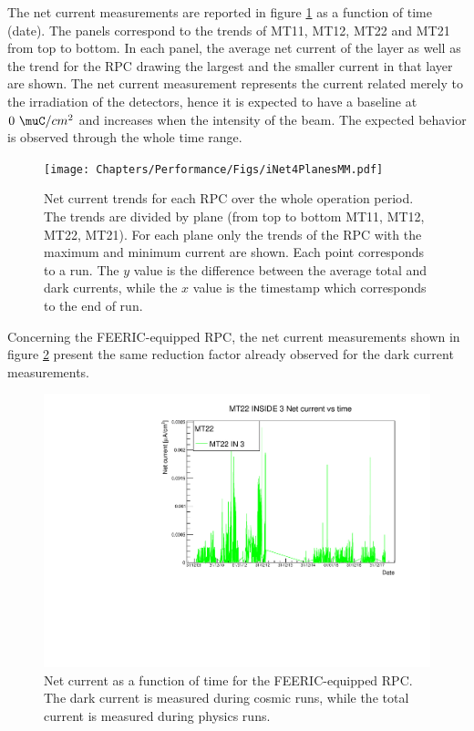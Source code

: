 The net current measurements are reported in figure \ref{fig:iNet4Planes} as a function of time (date).
The panels correspond to the trends of MT11, MT12, MT22 and MT21 from top to bottom.
In each panel, the average net current of the layer as well as the trend for the RPC drawing the largest and the smaller current in that layer are shown.
The net current measurement represents the current related merely to the irradiation of the detectors, hence it is expected to have a baseline at $0\ \muC/cm^2$ and increases when the intensity of the beam.
The expected behavior is observed through the whole time range.

\begin{figure}[!t]
\begin{center}
\texttt{[image: Chapters/Performance/Figs/iNet4PlanesMM.pdf]}
\caption{Net current trends for each RPC over the whole operation period. The trends are divided by plane (from top to bottom MT11, MT12, MT22, MT21). For each plane only the trends of the RPC with the maximum and minimum current are shown. Each point corresponds to a run. The $y$ value is the difference between the average total and dark currents, while the $x$ value is the timestamp which corresponds to the end of run.}
\label{fig:iNet4Planes}
\end{center}
\end{figure}

Concerning the FEERIC-equipped RPC, the net current measurements shown in figure \ref{fig:FEERICiNet} present the same reduction factor already observed for the dark current measurements.

\begin{figure}[!t]
\begin{center}
\includegraphics[width=0.95\linewidth]{Chapters/Performance/Figs/iNetFEERIC.pdf}
\caption{Net current as a function of time for the FEERIC-equipped RPC. The dark current is measured during cosmic runs, while the total current is measured during physics runs.}
\label{fig:FEERICiNet}
\end{center}
\end{figure}

